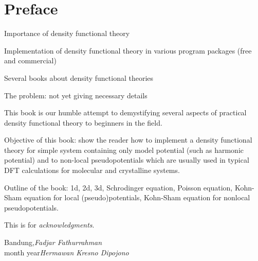 \chapter*{Preface}

Importance of density functional theory

Implementation of density functional theory in various program packages (free and commercial)

Several books about density functional theories

The problem: not yet giving necessary details

This book is our humble attempt to demystifying several aspects of practical density functional
theory to beginners in the field.

Objective of this book: show the reader how to implement a density functional theory
for simple system containing only model potential (such as harmonic potential)
and to non-local pseudopotentials which are usually used in typical DFT calculations
for molecular and crystalline systems.

Outline of the book:
1d, 2d, 3d, Schrodinger equation, Poisson equation, Kohn-Sham equation for local
(pseudo)potentials, Kohn-Sham equation for nonlocal pseudopotentials.

This is for \textit{acknowledgments}.
 
\vspace{\baselineskip}
\begin{flushright}\noindent
Bandung,\hfill {\it Fadjar Fathurrahman}\\
month year\hfill {\it Hermawan Kresno Dipojono}\\
\end{flushright}


